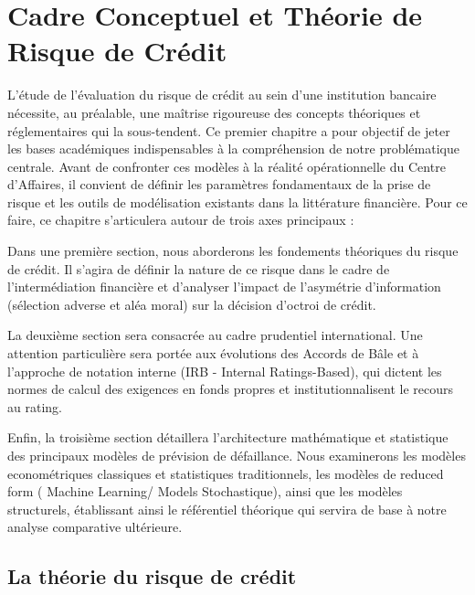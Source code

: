 \chapter{Cadre Conceptuel et Théorie de Risque de Crédit}

\newpage

L'étude de l'évaluation du risque de crédit au sein d'une institution bancaire nécessite, au préalable, une maîtrise rigoureuse des concepts théoriques et réglementaires qui la sous-tendent. Ce premier chapitre a pour objectif de jeter les bases académiques indispensables à la compréhension de notre problématique centrale. Avant de confronter ces modèles à la réalité opérationnelle du Centre d'Affaires, il convient de définir les paramètres fondamentaux de la prise de risque et les outils de modélisation existants dans la littérature financière. Pour ce faire, ce chapitre s'articulera autour de trois axes principaux :

Dans une première section, nous aborderons les fondements théoriques du risque de crédit. Il s'agira de définir la nature de ce risque dans le cadre de l'intermédiation financière et d'analyser l'impact de l'asymétrie d'information (sélection adverse et aléa moral) sur la décision d'octroi de crédit.

La deuxième section sera consacrée au cadre prudentiel international. Une attention particulière sera portée aux évolutions des Accords de Bâle et à l'approche de notation interne (IRB - Internal Ratings-Based), qui dictent les normes de calcul des exigences en fonds propres et institutionnalisent le recours au rating.

Enfin, la troisième section détaillera l'architecture mathématique et statistique des principaux modèles de prévision de défaillance. Nous examinerons les modèles econométriques classiques et statistiques traditionnels, les modèles de reduced form ( Machine Learning/ Models Stochastique), ainsi que les modèles structurels, établissant ainsi le référentiel théorique qui servira de base à notre analyse comparative ultérieure.


\section{La théorie du risque de crédit}
